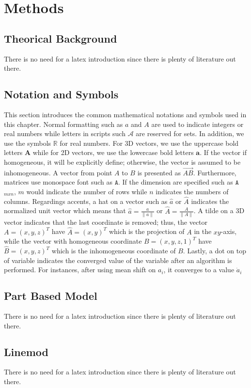 \chapter{Methods}
\label{chapter:Methods}



 
\section{Theorical Background}
There is no need for a latex introduction since there is plenty of literature out there.
 

\section{Notation and Symbols}
This section introduces the common mathematical notations and symbols used in this 
chapter.
Normal formatting such as $a$ and $A$ are used to indicate integers or real numbers while letters in scripts such $\mathcal{A}$ are reserved for sets. In addition, 
we use the symbols $\mathbb{R}$ for real numbers.
For 3D vectors, we use the uppercase bold letters $\mathbf{A}$ while for 2D vectors, 
we use the lowercase bold letters $\mathbf{a}$. If the vector if homogeneous, it will
be explicitly define; otherwise, the vector is assumed to be inhomogeneous. A vector
from point $A$ to $B$ is presented as $\overrightarrow{AB}$. Furthermore, matrices use
monospace font such as $\mathtt{A}$. If the dimension are specified such as $\mathtt{A}$$_{mxn}$,
$m$ would indicate the number of rows while $n$ indicates the numbers of columns.
Regardings accents, a hat on a vector such as $\hat{a}$ or $\hat{A}$ indicates the normalized
unit vector which means that $\hat{a}=\frac{a}{\|a\|}$ or $\hat{A}=\frac{A}{\|A\|}$.
A tilde on a 3D vector indicates that the last coordinate is removed; thus, the vector 
$A=(x,y,z)^T$ have $\hat{A}=(x,y)^T$  which is the projection of $A$ in the $xy$-axis,
while the vector with homogeneous coordinate $B=(x,y,z,1)^T$ have $\hat{B}=(x,y,z)^T$ 
which is the inhomogeneous coordinate of $B$. Lastly, a dot on top of variable indicates
the converged value of the variable after an algorithm is performed. For instances,
after using mean shift on $a_i$, it converges to a value $\dot{a}_i$

\section{Part Based Model}
There is no need for a latex introduction since there is plenty of literature out there.

\section{Linemod}
There is no need for a latex introduction since there is plenty of literature out there.
